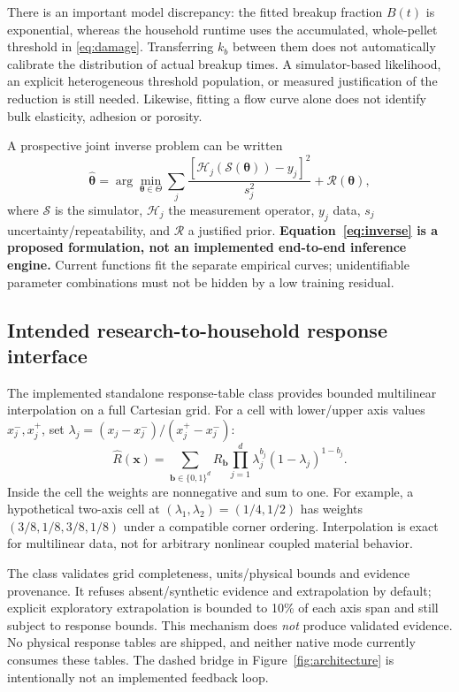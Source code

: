 There is an important model discrepancy: the fitted breakup fraction $B(t)$
is exponential, whereas the household runtime uses the accumulated,
whole-pellet threshold in \eqref{eq:damage}. Transferring $k_b$ between them does
not automatically calibrate the distribution of actual breakup times. A
simulator-based likelihood, an explicit heterogeneous threshold population, or
measured justification of the reduction is still needed. Likewise, fitting a
flow curve alone does not identify bulk elasticity, adhesion or porosity.

A prospective joint inverse problem can be written
\begin{equation}
 \widehat{\boldsymbol\theta}=\arg\min_{\boldsymbol\theta\in\Theta}
 \sum_j\frac{[\mathcal H_j(\mathcal S(\boldsymbol\theta))-y_j]^2}
                 {s_j^2}+\mathcal R(\boldsymbol\theta), \label{eq:inverse}
\end{equation}
where $\mathcal S$ is the simulator, $\mathcal H_j$ the measurement operator,
$y_j$ data, $s_j$ uncertainty/repeatability, and $\mathcal R$ a justified prior.
\textbf{Equation~\eqref{eq:inverse} is a proposed formulation, not an implemented
end-to-end inference engine.} Current functions fit the separate empirical
curves; unidentifiable parameter combinations must not be hidden by a low
training residual.

\subsection{Intended research-to-household response interface}
The implemented standalone response-table class provides bounded multilinear
interpolation on a full Cartesian grid. For a cell with lower/upper axis values
$x_j^-,x_j^+$, set $\lambda_j=(x_j-x_j^-)/(x_j^+-x_j^-)$:
\begin{equation}
 \widehat R(\mathbf{x})=\sum_{\mathbf b\in\{0,1\}^d}
 R_{\mathbf b}\prod_{j=1}^d
       \lambda_j^{b_j}(1-\lambda_j)^{1-b_j}. \label{eq:interpolation}
\end{equation}
Inside the cell the weights are nonnegative and sum to one. For example, a
hypothetical two-axis cell at $(\lambda_1,\lambda_2)=(1/4,1/2)$ has weights
$(3/8,1/8,3/8,1/8)$ under a compatible corner ordering. Interpolation is exact
for multilinear data, not for arbitrary nonlinear coupled material behavior.

The class validates grid completeness, units/physical bounds and evidence
provenance. It refuses absent/synthetic evidence and extrapolation by default;
explicit exploratory extrapolation is bounded to 10\% of each axis span and
still subject to response bounds. This mechanism does \emph{not} produce
validated evidence. No physical response tables are shipped, and neither native
mode currently consumes these tables. The dashed bridge in
Figure~\ref{fig:architecture} is intentionally not an implemented feedback loop.

